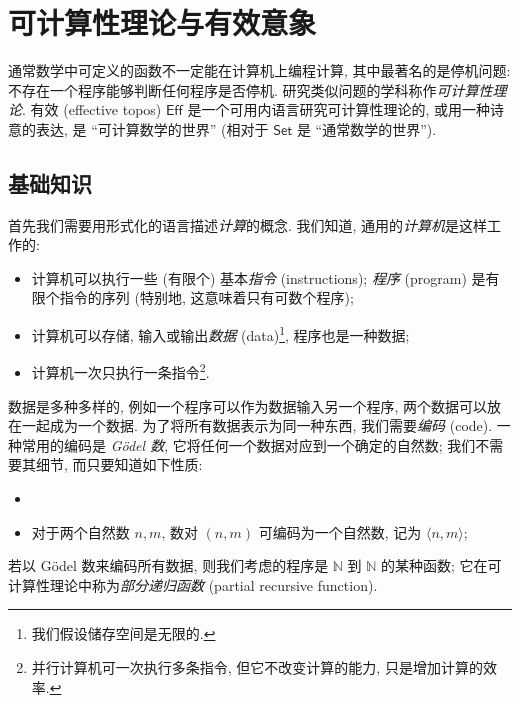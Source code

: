 \section{可计算性理论与有效意象}

通常数学中可定义的函数不一定能在计算机上编程计算, 其中最著名的是停机问题: 不存在一个程序能够判断任何程序是否停机. 研究类似问题的学科称作\emph{可计算性理论}. 有效\topos{} (effective topos) $\mathsf {Eff}$ 是一个可用内语言研究可计算性理论的\topos{}, 或用一种诗意的表达, 是 ``可计算数学的世界'' (相对于 $\mathsf {Set}$ 是 ``通常数学的世界'').

\subsection{基础知识}

首先我们需要用形式化的语言描述\emph{计算}的概念. 我们知道, 通用的\emph{计算机}是这样工作的:
\begin{itemize}
	\item 计算机可以执行一些 (有限个) 基本\emph{指令} (instructions); \emph{程序} (program) 是有限个指令的序列 (特别地, 这意味着只有可数个程序);
	\item 计算机可以存储, 输入或输出\emph{数据} (data)\footnote{我们假设储存空间是无限的.}, 程序也是一种数据;
	\item 计算机一次只执行一条指令\footnote{并行计算机可一次执行多条指令, 但它不改变计算的能力, 只是增加计算的效率.}.
\end{itemize}

数据是多种多样的, 例如一个程序可以作为数据输入另一个程序, 两个数据可以放在一起成为一个数据. 为了将所有数据表示为同一种东西, 我们需要\emph{编码} (code). 一种常用的编码是 \emph{G\"odel 数}, 它将任何一个数据对应到一个确定的自然数; 我们不需要其细节, 而只要知道如下性质:
\begin{itemize}
	\item 
	\item 对于两个自然数 $n,m$, 数对 $(n,m)$ 可编码为一个自然数, 记为 $\langle n,m \rangle$;
\end{itemize}

若以 G\"odel 数来编码所有数据, 则我们考虑的程序是 $\mathbb{N}$ 到 $\mathbb{N}$ 的某种函数; 它在可计算性理论中称为\emph{部分递归函数} (partial recursive function).

